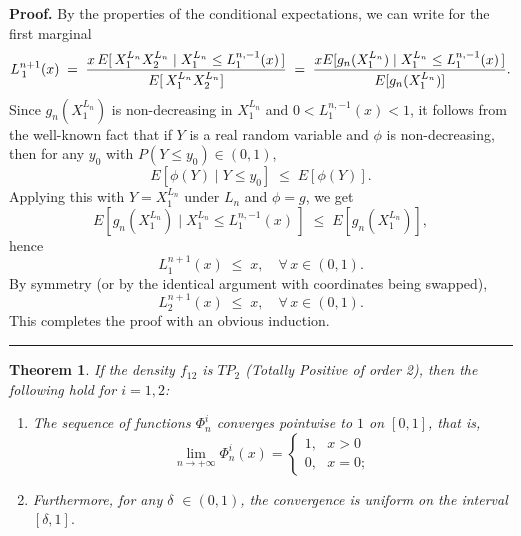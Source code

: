 \documentclass[onecolumn]{article}
\newtheorem{theorem}{Theorem}
\newenvironment{proof}[1][Proof]{\noindent\textbf{#1.} }{\ \rule{0.5em}{0.5em}}
\begin{document}
\begin{proof}
By the properties of the conditional expectations, we can write for the
first marginal 
\begin{equation}
L_{\,1}^{n+1}(x)\;=\;\frac{x\,E[\,X_{1}^{L_{n}}X_{2}^{L_{n}}\mid
X_{1}^{L_{n}}\leq L_{1}^{n,-1}(x)\,]}{E[\,X_{1}^{L_{n}}X_{2}^{L_{n}}]}\;=\;%
\frac{xE[g_{n}(X_{1}^{L_{n}})\mid X_{1}^{L_{n}}\leq L_{1}^{n,-1}(x)\,]}{%
E[g_{n}(X_{1}^{L_{n}})]}.  \label{316}
\end{equation}%
Since $g_{n}(X_{1}^{L_{n}})$ is non-decreasing in $X_{1}^{L_{n}}$ and $%
0<L_{1}^{n,-1}(x)<1$, it follows from the well-known fact that if $Y$ is a
real random variable and $\phi $ is non-decreasing, then for any $y_{0}$
with $P(Y\leq y_{0})\in (0,1)$, 
\begin{equation}
E[\phi (Y)\mid Y\leq y_{0}]\;\leq \;E[\phi (Y)].  \label{317}
\end{equation}%
Applying this with $Y=X_{1}^{L_{n}}$ under $L_{n}$ and $\phi =g$, we get 
\begin{equation}
E[g_{n}(X_{1}^{L_{n}})\mid X_{1}^{L_{n}}\leq L_{1}^{n,-1}(x)\,]\;\leq
\;E[g_{n}(X_{1}^{L_{n}})],  \label{318}
\end{equation}%
hence 
\begin{equation}
L_{1}^{n+1}(x)\;\leq \;x,\quad \forall \,x\in (0,1).  \label{319}
\end{equation}%
By symmetry (or by the identical argument with coordinates being swapped), 
\begin{equation}
L_{2}^{n+1}(x)\;\leq \;x,\quad \forall \,x\in (0,1).  \label{320}
\end{equation}%
This completes the proof with an obvious induction.
\end{proof}

\begin{theorem}
\label{Phi-conv-TP2} If the density $f_{12}$ is $TP_{2}$ (Totally Positive
of order 2), then the following hold for $i=1,2$:

\begin{enumerate}
\item The sequence of functions $\Phi _{n}^{i}$ converges pointwise to $1$
on $[0,1]$, that is, 
\begin{equation}
\lim_{n\rightarrow +\infty }\Phi _{n}^{i}(x)=\left\{ 
\begin{array}{c}
1,\text{ }x>0 \\ 
0,\text{ }x=0;%
\end{array}%
\right.  \label{320a}
\end{equation}

\item Furthermore, for any $\delta $ $\in (0,1)$, the convergence is uniform
on the interval $[\delta ,1].$
\end{enumerate}
\end{theorem}
\end{document}
